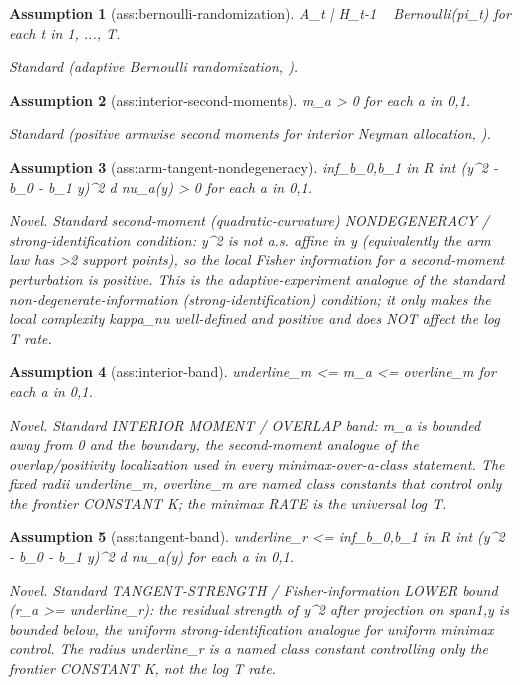\documentclass{article}
\newtheorem{assumption}{Assumption}
\begin{document}
\begin{assumption}[ass:bernoulli-randomization]\label{ass:bernoulli-randomization}
A_t | H_{t-1} ~ Bernoulli(pi_t) for each t in {1, ..., T}.
\par\smallskip\noindent\emph{Standard} (adaptive Bernoulli randomization, \cite{dai2023clipogd}).
\end{assumption}

\begin{assumption}[ass:interior-second-moments]\label{ass:interior-second-moments}
m_a > 0 for each a in {0,1}.
\par\smallskip\noindent\emph{Standard} (positive armwise second moments for interior Neyman allocation, \cite{neopane2024logarithmic}).
\end{assumption}

\begin{assumption}[ass:arm-tangent-nondegeneracy]\label{ass:arm-tangent-nondegeneracy}
inf_{b_0,b_1 in R} int (y^2 - b_0 - b_1 y)^2 d nu_a(y) > 0 for each a in {0,1}.
\par\smallskip\noindent\emph{Novel.} Standard second-moment (quadratic-curvature) NONDEGENERACY / strong-identification condition: y^2 is not a.s. affine in y (equivalently the arm law has >2 support points), so the local Fisher information for a second-moment perturbation is positive. This is the adaptive-experiment analogue of the standard non-degenerate-information (strong-identification) condition; it only makes the local complexity kappa_nu well-defined and positive and does NOT affect the log T rate.
\end{assumption}

\begin{assumption}[ass:interior-band]\label{ass:interior-band}
underline_m <= m_a <= overline_m for each a in {0,1}.
\par\smallskip\noindent\emph{Novel.} Standard INTERIOR MOMENT / OVERLAP band: m_a is bounded away from 0 and the boundary, the second-moment analogue of the overlap/positivity localization used in every minimax-over-a-class statement. The fixed radii underline_m, overline_m are named class constants that control only the frontier CONSTANT K; the minimax RATE is the universal log T.
\end{assumption}

\begin{assumption}[ass:tangent-band]\label{ass:tangent-band}
underline_r <= inf_{b_0,b_1 in R} int (y^2 - b_0 - b_1 y)^2 d nu_a(y) for each a in {0,1}.
\par\smallskip\noindent\emph{Novel.} Standard TANGENT-STRENGTH / Fisher-information LOWER bound (r_a >= underline_r): the residual strength of y^2 after projection on span{1,y} is bounded below, the uniform strong-identification analogue for uniform minimax control. The radius underline_r is a named class constant controlling only the frontier CONSTANT K, not the log T rate.
\end{assumption}
\end{document}
